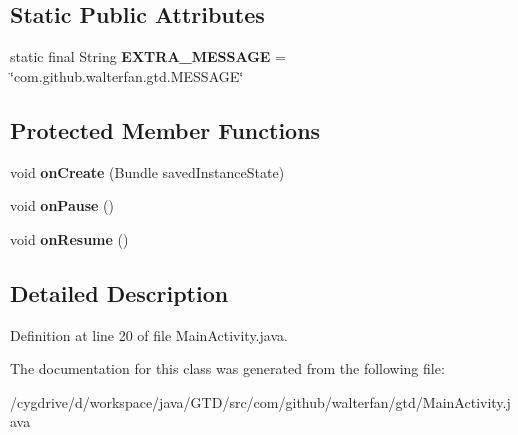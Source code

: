 \subsection*{Static Public Attributes}
\begin{DoxyCompactItemize}
\item 
\hypertarget{classcom_1_1github_1_1walterfan_1_1gtd_1_1MainActivity_a7ec58a90574e99cd1690234e4b3ed681}{static final String {\bfseries E\-X\-T\-R\-A\-\_\-\-M\-E\-S\-S\-A\-G\-E} = \char`\"{}com.\-github.\-walterfan.\-gtd.\-M\-E\-S\-S\-A\-G\-E\char`\"{}}\label{classcom_1_1github_1_1walterfan_1_1gtd_1_1MainActivity_a7ec58a90574e99cd1690234e4b3ed681}

\end{DoxyCompactItemize}
\subsection*{Protected Member Functions}
\begin{DoxyCompactItemize}
\item 
\hypertarget{classcom_1_1github_1_1walterfan_1_1gtd_1_1MainActivity_a53383ef32321c58d4489683e6d1bb1d7}{void {\bfseries on\-Create} (Bundle saved\-Instance\-State)}\label{classcom_1_1github_1_1walterfan_1_1gtd_1_1MainActivity_a53383ef32321c58d4489683e6d1bb1d7}

\item 
\hypertarget{classcom_1_1github_1_1walterfan_1_1gtd_1_1MainActivity_a1ded6042012880d7238d75e641341b9e}{void {\bfseries on\-Pause} ()}\label{classcom_1_1github_1_1walterfan_1_1gtd_1_1MainActivity_a1ded6042012880d7238d75e641341b9e}

\item 
\hypertarget{classcom_1_1github_1_1walterfan_1_1gtd_1_1MainActivity_afa16af2fabfbdd75853d550245d4a28d}{void {\bfseries on\-Resume} ()}\label{classcom_1_1github_1_1walterfan_1_1gtd_1_1MainActivity_afa16af2fabfbdd75853d550245d4a28d}

\end{DoxyCompactItemize}


\subsection{Detailed Description}


Definition at line 20 of file Main\-Activity.\-java.



The documentation for this class was generated from the following file\-:\begin{DoxyCompactItemize}
\item 
/cygdrive/d/workspace/java/\-G\-T\-D/src/com/github/walterfan/gtd/Main\-Activity.\-java\end{DoxyCompactItemize}
